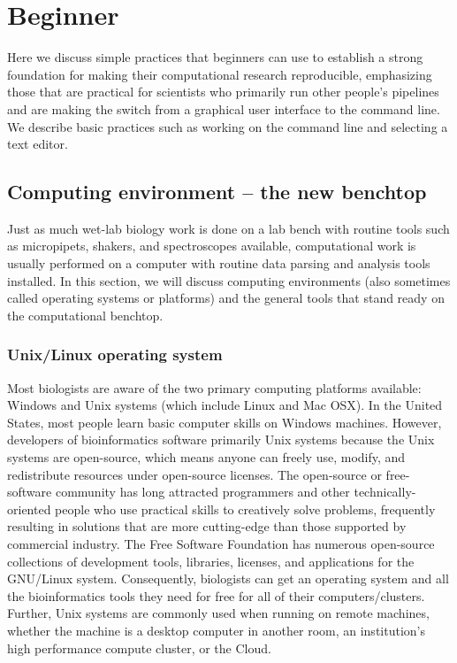 \documentclass[ChapterTOCs,krantz2]{krantz} %
\begin{document}
\section{Beginner} Here we discuss simple practices that beginners can use
to establish a strong foundation for making their computational research
reproducible, emphasizing those that are practical for scientists who primarily
run other people's pipelines and are making the switch from a graphical user
interface to the command line. We describe basic practices such as working
on the command line and selecting a text editor.  

\subsection{Computing environment -- the new benchtop}

Just as much wet-lab biology work is done on a lab bench with routine tools
such as micropipets, shakers, and spectroscopes available, computational work
is usually performed on a computer with routine data parsing and analysis tools
installed.  In this section, we will discuss computing environments (also
sometimes called operating systems or platforms) and the general tools that
stand ready on the computational benchtop.  

\subsubsection{Unix/Linux operating system}

Most biologists are aware of the two primary computing platforms available:
Windows and Unix systems (which include Linux and Mac OSX). 
In the United States, most people
learn basic computer skills on Windows machines.  
However, developers of bioinformatics
software primarily Unix systems because the Unix
systems are open-source, which means anyone can freely use, modify, and
redistribute resources under open-source licenses.  The open-source or 
free-software community has long attracted programmers and other 
technically-oriented people who use practical skills  
to creatively solve problems, frequently resulting in solutions that 
are more cutting-edge than  
those supported by commercial industry.    
The Free Software Foundation\cite{FSF} has numerous 
open-source collections of development
tools, libraries, licenses, and applications for the GNU/Linux system.
Consequently, biologists can get an operating system and all the bioinformatics
tools they need for free for all of their computers/clusters.  
Further, Unix systems are commonly used when 
running on remote machines, whether the machine is a desktop computer 
in another room, an institution's high performance compute cluster, or 
the Cloud.
\end{document}
